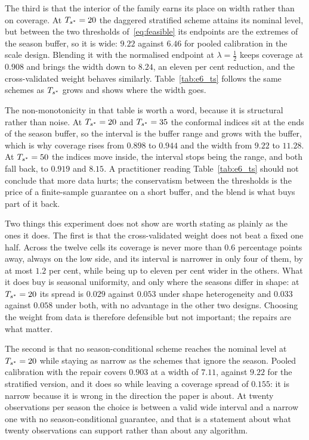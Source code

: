 The third is that the interior of the family earns its place on width
rather than on coverage.  At $T_{s^*} = 20$ the daggered stratified scheme
attains its nominal level, but between the two thresholds
of~\eqref{eq:feasible} its endpoints are the extremes of the season
buffer, so it is wide: $9.22$ against $6.46$ for pooled calibration in
the scale design.  Blending it with the normalised endpoint at
$\lambda = \tfrac12$ keeps coverage at $0.908$ and brings the width down
to $8.24$, an eleven per cent reduction, and the cross-validated weight
behaves similarly.  Table~\ref{tab:e6_ts} follows the same schemes as
$T_{s^*}$ grows and shows where the width goes.



The non-monotonicity in that table is worth a word, because it is
structural rather than noise.  At $T_{s^*} = 20$ and $T_{s^*} = 35$ the
conformal indices sit at the ends of the season buffer, so the interval
is the buffer range and grows with the buffer, which is why coverage
rises from $0.898$ to $0.944$ and the width from $9.22$ to $11.28$.  At
$T_{s^*} = 50$ the indices move inside, the interval stops being the range,
and both fall back, to $0.919$ and $8.15$.  A practitioner reading
Table~\ref{tab:e6_ts} should not conclude that more data hurts; the
conservatism between the thresholds is the price of a finite-sample
guarantee on a short buffer, and the blend is what buys part of it back.

Two things this experiment does not show are worth stating as plainly as
the ones it does.  The first is that the cross-validated weight does not
beat a fixed one half.  Across the twelve cells its coverage is never
more than $0.6$ percentage points away, always on the low side, and its
interval is narrower in only four of them, by at most $1.2$ per cent,
while being up to eleven per cent wider in the others.  What it does buy is
seasonal uniformity, and only where the seasons differ in shape: at
$T_{s^*} = 20$ its spread is $0.029$ against $0.053$ under shape
heterogeneity and $0.033$ against $0.058$ under both, with no advantage
in the other two designs.  Choosing the weight from data is therefore
defensible but not important; the repairs are what matter.

The second is that no season-conditional scheme reaches the nominal
level at $T_{s^*} = 20$ while staying as narrow as the schemes that ignore
the season.  Pooled calibration with the repair covers $0.903$ at a width
of $7.11$, against $9.22$ for the stratified version, and it does so
while leaving a coverage spread of $0.155$: it is narrow because it is
wrong in the direction the paper is about.  At twenty observations per
season the choice is between a valid wide interval and a narrow one with
no season-conditional guarantee, and that is a statement about what
twenty observations can support rather than about any algorithm.

